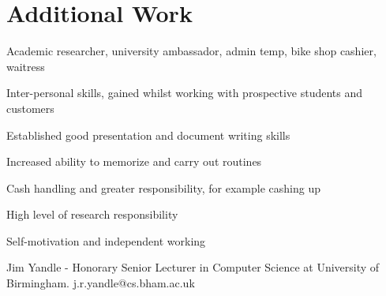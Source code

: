\documentclass[freya.tex]{subfiles}
\begin{document}
\section{Additional Work}
\normalfont
{} 
\begin{tightemize}
\item Academic researcher, university ambassador, admin temp, bike shop cashier, waitress\\
\end{tightemize}
\begin{tightemize}
\item Inter-personal skills, gained whilst working with prospective students and customers
\item Established good presentation and document writing skills
\item Increased ability to memorize and carry out routines
\item Cash handling and greater responsibility, for example cashing up
\item High level of research responsibility
\item Self-motivation and independent working    
\end{tightemize}

\begin{verbose}
\sectionsep
{}
Jim Yandle - Honorary Senior Lecturer in Computer Science at University of Birmingham. j.r.yandle@cs.bham.ac.uk

\end{verbose}
\end{document}
